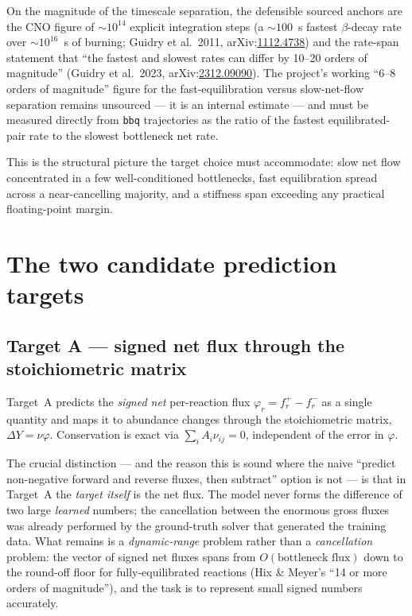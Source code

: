 \documentclass[11pt]{article}
\newcommand{\arxiv}[1]{arXiv:\href{https://arxiv.org/abs/#1}{#1}}
\begin{document}
On the magnitude of the timescale separation, the defensible sourced anchors are the CNO figure of $\sim 10^{14}$ explicit integration steps (a $\sim 100$~s fastest $\beta$-decay rate over $\sim 10^{16}$~s of burning; Guidry et al.\ 2011, \arxiv{1112.4738}) and the rate-span statement that ``the fastest and slowest rates can differ by 10--20 orders of magnitude'' (Guidry et al.\ 2023, \arxiv{2312.09090}). The project's working ``6--8 orders of magnitude'' figure for the fast-equilibration versus slow-net-flow separation remains unsourced --- it is an internal estimate --- and must be measured directly from \texttt{bbq} trajectories as the ratio of the fastest equilibrated-pair rate to the slowest bottleneck net rate.

This is the structural picture the target choice must accommodate: slow net flow concentrated in a few well-conditioned bottlenecks, fast equilibration spread across a near-cancelling majority, and a stiffness span exceeding any practical floating-point margin.

\section{The two candidate prediction targets}

\subsection{Target A --- signed net flux through the stoichiometric matrix}

Target~A predicts the \emph{signed net} per-reaction flux $\varphi_r = f_r^+ - f_r^-$ as a single quantity and maps it to abundance changes through the stoichiometric matrix, $\Delta Y = \nu\varphi$. Conservation is exact via $\sum_i A_i \nu_{ij} = 0$, independent of the error in $\varphi$.

The crucial distinction --- and the reason this is sound where the naive ``predict non-negative forward and reverse fluxes, then subtract'' option is not --- is that in Target~A the \emph{target itself} is the net flux. The model never forms the difference of two large \emph{learned} numbers; the cancellation between the enormous gross fluxes was already performed by the ground-truth solver that generated the training data. What remains is a \emph{dynamic-range} problem rather than a \emph{cancellation} problem: the vector of signed net fluxes spans from $O(\text{bottleneck flux})$ down to the round-off floor for fully-equilibrated reactions (Hix \& Meyer's ``14 or more orders of magnitude''), and the task is to represent small signed numbers accurately.
\end{document}
